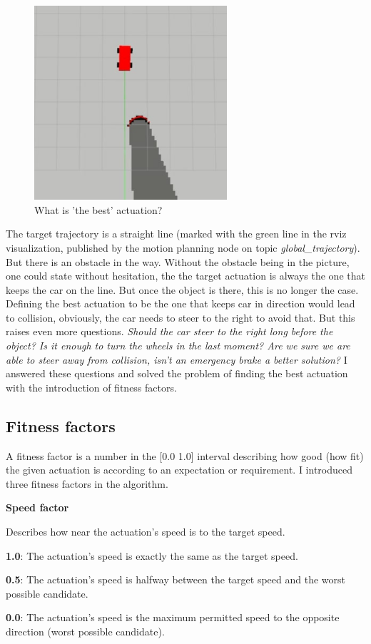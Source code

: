 \begin{figure}[!ht]
    \centering
    \includegraphics[height=72mm]{figures/raw/jpeg/rviz_straight_traj_static_object.jpg}
    \caption{What is 'the best' actuation?}
    \label{what_is_the_best_actuation}
\end{figure}

The target trajectory is a straight line (marked with the green line in the rviz visualization, published by the motion planning node on topic \textit{global\_trajectory}). But there is an obstacle in the way. Without the obstacle being in the picture, one could state without hesitation, the the target actuation is always the one that keeps the car on the line. But once the object is there, this is no longer the case. Defining the best actuation to be the one that keeps car in direction would lead to collision, obviously, the car needs to steer to the right to avoid that. But this raises even more questions. \textit{Should the car steer to the right long before the object? Is it enough to turn the wheels in the last moment? Are we sure we are able to steer away from collision, isn't an emergency brake a better solution?} I answered these questions and solved the problem of finding the best actuation with the introduction of fitness factors.

\subsection{Fitness factors}
A fitness factor is a number in the [0.0 1.0] interval describing how good (how fit) the given actuation is according to an expectation or requirement. I introduced three fitness factors in the algorithm.

\begin{minipage}{\textwidth}
\textbf{Speed factor}

Describes how near the actuation's speed is to the target speed.

\textbf{1.0}: The actuation's speed is exactly the same as the target speed.

\textbf{0.5}: The actuation's speed is halfway between the target speed and the worst possible candidate.

\textbf{0.0}: The actuation's speed is the maximum permitted speed to the opposite direction (worst possible candidate).
\end{minipage}

